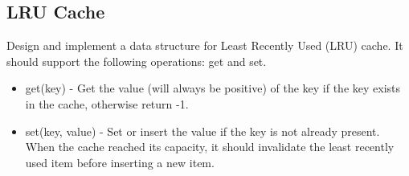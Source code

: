 \documentclass[12pt]{book}
\begin{document}
\subsection{LRU Cache}
\label{sec-19-2-1}
Design and implement a data structure for Least Recently Used (LRU) cache. It should support the following operations: get and set.
\begin{itemize}
\item get(key) - Get the value (will always be positive) of the key if the key exists in the cache, otherwise return -1.
\item set(key, value) - Set or insert the value if the key is not already
present. When the cache reached its capacity, it should invalidate
the least recently used item before inserting a new item.
\end{itemize}
\lstset{language=java,label= ,caption= ,numbers=none}
\end{document}
